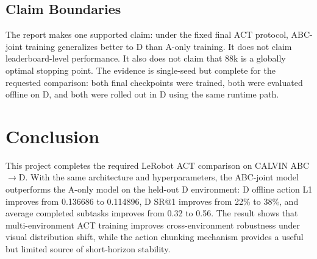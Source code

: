 \documentclass[10pt,twocolumn]{article}
\begin{document}
\subsection{Claim Boundaries}

The report makes one supported claim: under the fixed final ACT protocol, ABC-joint training generalizes better to D than A-only training. It does not claim leaderboard-level performance. It also does not claim that 88k is a globally optimal stopping point. The evidence is single-seed but complete for the requested comparison: both final checkpoints were trained, both were evaluated offline on D, and both were rolled out in D using the same runtime path.

\section{Conclusion}

This project completes the required LeRobot ACT comparison on CALVIN ABC$\rightarrow$D. With the same architecture and hyperparameters, the ABC-joint model outperforms the A-only model on the held-out D environment: D offline action L1 improves from 0.136686 to 0.114896, D SR@1 improves from 22\% to 38\%, and average completed subtasks improves from 0.32 to 0.56. The result shows that multi-environment ACT training improves cross-environment robustness under visual distribution shift, while the action chunking mechanism provides a useful but limited source of short-horizon stability.
\end{document}

